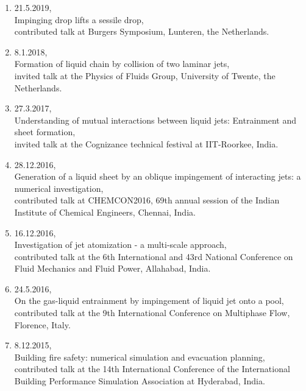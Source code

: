\documentclass[11pt,a4paper,roman,english,colorlinks,linkcolor=true]{moderncv}
\begin{document}
\begin{enumerate}[leftmargin=2.5cm]
	\item 21.5.2019,\\
	Impinging drop lifts a sessile drop,\\
	contributed talk at Burgers Symposium, Lunteren, the Netherlands.
		
	\item 8.1.2018,\\
	Formation of liquid chain by collision of two laminar jets,\\
	invited talk at the Physics of Fluids Group, University of Twente, the Netherlands.
	
	\item 27.3.2017,\\
	Understanding of mutual interactions between liquid jets: Entrainment and sheet formation,\\
	invited talk at the Cognizance technical festival at IIT-Roorkee, India.
	
	\item 28.12.2016,\\
	Generation of a liquid sheet by an oblique impingement of interacting jets: a numerical investigation,\\
	contributed talk at CHEMCON2016, 69th annual session of the Indian Institute of Chemical Engineers, Chennai, India.
	
	\item 16.12.2016,\\
	Investigation of jet atomization - a multi-scale approach,\\
	contributed talk at the 6th International and 43rd National Conference on Fluid Mechanics and Fluid Power, Allahabad, India.
	
	\item 24.5.2016,\\
	On the gas-liquid entrainment by impingement of liquid jet onto a pool,\\
	contributed talk at the 9th International Conference on Multiphase Flow, Florence, Italy.
	
	\item 8.12.2015,\\
	Building fire safety: numerical simulation and evacuation planning,\\
	contributed talk at the 14th International Conference of the International Building Performance Simulation Association at Hyderabad, India.
\end{enumerate}
\end{document}
